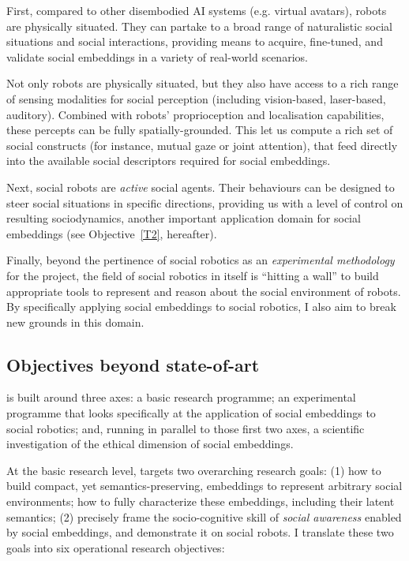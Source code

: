 First, compared to other disembodied AI systems (e.g. virtual avatars), robots
are physically situated.  They can partake to a broad range of naturalistic
social situations and social interactions, providing means to acquire,
fine-tuned, and validate social embeddings in a variety of real-world scenarios.

Not only robots are physically situated, but they also have access to a rich
range of sensing modalities for social perception (including vision-based,
laser-based, auditory). Combined with robots' proprioception and localisation
capabilities, these percepts can be fully spatially-grounded. This let us
compute a rich set of social constructs (for instance, mutual gaze or joint
attention), that feed directly into the available social descriptors required
for social embeddings.

Next, social robots are \emph{active} social agents. Their behaviours can be
designed to steer social situations in specific directions, providing us with a
level of control on resulting sociodynamics, another important application
domain for social embeddings (see Objective~\ref{T2}, hereafter).

Finally, beyond the pertinence of social robotics as an \emph{experimental
methodology} for the \project project, the field of social robotics in itself is
``hitting a wall''  to build appropriate tools to represent and
reason about the social environment of robots. By specifically applying social
embeddings to social robotics, I also aim to break new grounds in this domain.

\subsection{Objectives beyond state-of-art}


\project is built around three axes: a basic research programme; an experimental
programme that looks specifically at the application of social embeddings to
social robotics; and, running in parallel to those first two axes, a scientific
investigation of the ethical dimension of social embeddings.

At the basic research level, \project targets two overarching research goals:
(1) how to build compact, yet semantics-preserving, embeddings to represent
arbitrary social environments; how to fully characterize these embeddings,
including their latent semantics; (2) precisely frame the socio-cognitive skill
of \emph{social awareness} enabled by social embeddings, and demonstrate it on
social robots.  I translate these two goals into six operational research
objectives:

